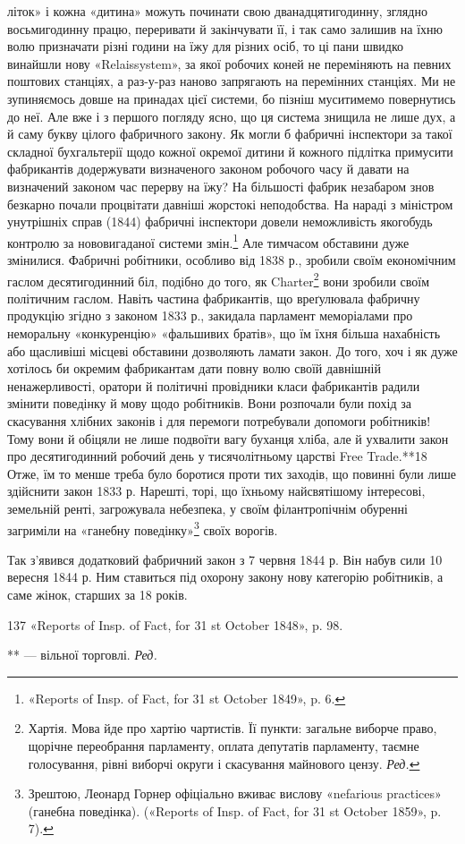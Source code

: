 літок» і кожна «дитина» можуть починати свою дванадцятигодинну,
зглядно восьмигодинну працю, переривати й закінчувати
її, і так само залишив на їхню волю призначати різні години
на їжу для різних осіб, то ці пани швидко винайшли нову
«Relaissystem», за якої робочих коней не переміняють на певних
поштових станціях, а раз-у-раз наново запрягають на перемінних
станціях. Ми не зупиняємось довше на принадах цієї
системи, бо пізніш муситимемо повернутись до неї. Але вже і з
першого погляду ясно, що ця система знищила не лише дух, а й
саму букву цілого фабричного закону. Як могли б фабричні
інспектори за такої складної бухгальтерії щодо кожної окремої
дитини й кожного підлітка примусити фабрикантів додержувати
визначеного законом робочого часу й давати на визначений законом
час перерву на їжу? На більшості фабрик незабаром знов
безкарно почали процвітати давніші жорстокі неподобства.
На нараді з міністром унутрішніх справ (1844) фабричні інспектори
довели неможливість якогобудь контролю за нововигаданої
системи змін.\footnote{
«Reports of Insp. of Fact, for 31 st October 1849», p. 6.
} Але тимчасом обставини дуже змінилися. Фабричні
робітники, особливо від 1838 р., зробили своїм економічним гаслом
десятигодинний біл, подібно до того, як Charter\footnote*{
Хартія. Мова йде про хартію чартистів. Її пункти: загальне виборче
право, щорічне переобрання парламенту, оплата депутатів парламенту,
таємне голосування, рівні виборчі округи і скасування майнового
цензу. \emph{Ред.}
} вони зробили своїм
політичним гаслом. Навіть частина фабрикантів, що вреґулювала
фабричну продукцію згідно з законом 1833 р., закидала парламент
меморіалами про неморальну «конкуренцію» «фальшивих братів»,
що їм їхня більша нахабність або щасливіші місцеві обставини
дозволяють ламати закон. До того, хоч і як дуже хотілось би
окремим фабрикантам дати повну волю своїй давнішній ненажерливості,
оратори й політичні провідники класи фабрикантів радили
змінити поведінку й мову щодо робітників. Вони розпочали
були похід за скасування хлібних законів і для перемоги потребували
допомоги робітників! Тому вони й обіцяли не лише подвоїти
вагу буханця хліба, але й ухвалити закон про десятигодинний
робочий день у тисячолітньому царстві Free Trade.**18
Отже, їм то менше треба було боротися проти тих заходів, що
повинні були лише здійснити закон 1833 р. Нарешті, торі, що їхньому
найсвятішому інтересові, земельній ренті, загрожувала
небезпека, у своїм філантропічнім обуренні загриміли на «ганебну
поведінку»\footnote{
Зрештою, Леонард Горнер офіціально вживає вислову «nefarious
practices» (ганебна поведінка). («Reports of Insp. of Fact, for 31 st
October 1859», p. 7).
} своїх ворогів.

Так з’явився додатковий фабричний закон з 7 червня 1844 р.
Він набув сили 10 вересня 1844 р. Ним ставиться під охорону закону
нову категорію робітників, а саме жінок, старших за 18 років.

137 «Reports of Insp. of Fact, for 31 st October 1848», p. 98.

** — вільної торговлі. \emph{Ред.}
